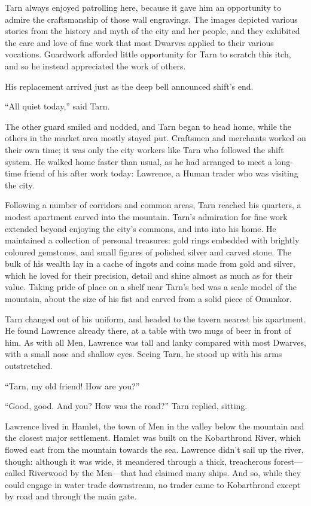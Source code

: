 Tarn always enjoyed patrolling here, because it gave him an opportunity to admire the craftsmanship of those wall engravings.  The images depicted various stories from the history and myth of the city and her people, and they exhibited the care and love of fine work that most Dwarves applied to their various vocations.  Guardwork afforded little opportunity for Tarn to scratch this itch, and so he instead appreciated the work of others.

His replacement arrived just as the deep bell announced shift's end.

``All quiet today,'' said Tarn.

The other guard smiled and nodded, and Tarn began to head home, while the others in the market area mostly stayed put.  Craftsmen and merchants worked on their own time; it was only the city workers like Tarn who followed the shift system.  He walked home faster than usual, as he had arranged to meet a long-time friend of his after work today: Lawrence, a Human trader who was visiting the city.

Following a number of corridors and common areas, Tarn reached his quarters, a modest apartment carved into the mountain.
Tarn's admiration for fine work extended beyond enjoying the city's commons, and into into his home.  He maintained a collection of personal treasures: gold rings embedded with brightly coloured gemstones, and small figures of polished silver and carved stone.  The bulk of his wealth lay in a cache of ingots and coins made from gold and silver, which he loved for their precision, detail and shine almost as much as for their value.  Taking pride of place on a shelf near Tarn's bed was a scale model of the mountain, about the size of his fist and carved from a solid piece of Omunkor.

Tarn changed out of his uniform, and headed to the tavern nearest his apartment.  He found Lawrence already there, at a table with two mugs of beer in front of him.  As with all Men, Lawrence was tall and lanky compared with most Dwarves, with a small nose and shallow eyes.  Seeing Tarn, he stood up with his arms outstretched.

``Tarn, my old friend!  How are you?''

``Good, good.  And you?  How was the road?'' Tarn replied, sitting.

Lawrence lived in Hamlet, the town of Men in the valley below the mountain and the closest major settlement.  Hamlet was built on the Kobarthrond River, which flowed east from the mountain towards the sea.  Lawrence didn't sail up the river, though: although it was wide, it meandered through a thick, treacherous forest---called Riverwood by the Men---that had claimed many ships.  And so, while they could engage in water trade downstream, no trader came to Kobarthrond except by road and through the main gate.

